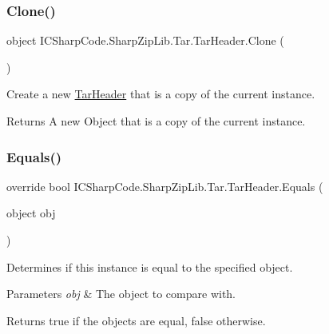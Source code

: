 \subsubsection{\texorpdfstring{Clone()}{Clone()}}
{\footnotesize\ttfamily object I\+C\+Sharp\+Code.\+Sharp\+Zip\+Lib.\+Tar.\+Tar\+Header.\+Clone (\begin{DoxyParamCaption}{ }\end{DoxyParamCaption})\hspace{0.3cm}{\ttfamily [inline]}}



Create a new \hyperlink{class_i_c_sharp_code_1_1_sharp_zip_lib_1_1_tar_1_1_tar_header}{Tar\+Header} that is a copy of the current instance. 

\begin{DoxyReturn}{Returns}
A new Object that is a copy of the current instance.
\end{DoxyReturn}
\mbox{\label{class_i_c_sharp_code_1_1_sharp_zip_lib_1_1_tar_1_1_tar_header_a2af94c35cc70cfcae44393af42fdd318}} 
\subsubsection{\texorpdfstring{Equals()}{Equals()}}
{\footnotesize\ttfamily override bool I\+C\+Sharp\+Code.\+Sharp\+Zip\+Lib.\+Tar.\+Tar\+Header.\+Equals (\begin{DoxyParamCaption}\item[{object}]{obj }\end{DoxyParamCaption})\hspace{0.3cm}{\ttfamily [inline]}}



Determines if this instance is equal to the specified object. 


\begin{DoxyParams}{Parameters}
{\em obj} & The object to compare with.\\
\hline
\end{DoxyParams}
\begin{DoxyReturn}{Returns}
true if the objects are equal, false otherwise.
\end{DoxyReturn}
\mbox{\label{class_i_c_sharp_code_1_1_sharp_zip_lib_1_1_tar_1_1_tar_header_a3bb0d550a8235be5ddd39867ba986d9b}} 
